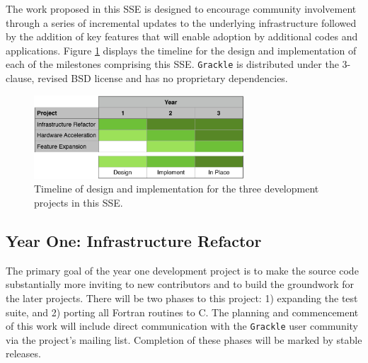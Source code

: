 \documentclass[11pt]{article}
\newcommand{\grackle}{\texttt{Grackle}}
\begin{document}
\begin{flushleft}
The work proposed in this SSE is designed to encourage community
involvement through a series of incremental updates to the underlying
infrastructure followed by the addition of key features that will
enable adoption by additional codes and applications.  Figure
\ref{fig:gantt} displays the timeline for the design and
implementation of each of the milestones comprising this SSE.
\grackle{} is distributed under the 3-clause, revised BSD license and
has no proprietary dependencies.

\begin{figure}
\begin{center}
\includegraphics[width=0.7\textwidth]{figures/gantt.pdf}
\caption{Timeline of design and implementation for the three
  development projects in this SSE.}
\label{fig:gantt}
\end{center}
\vspace*{-2\baselineskip}
\end{figure}

\subsection{Year One: Infrastructure Refactor}

The primary goal of the year one development project is to make the
source code substantially more inviting to new contributors and to
build the groundwork for the later projects.  There will be two phases
to this project: 1) expanding the test suite, and 2) porting all
Fortran routines to C.  The planning and commencement of this work
will include direct communication with the \grackle{} user community
via the project's mailing list.  Completion of these phases will be
marked by stable releases.


\end{flushleft}
\end{document}
